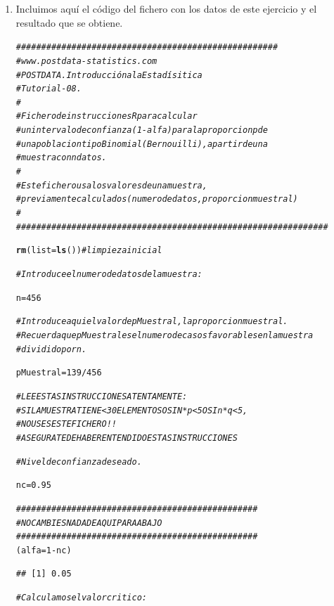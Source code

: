 \documentclass[10pt,a4paper]{article}\usepackage[]{graphicx}\usepackage[]{color}
\makeatletter
\newcommand{\hlnum}[1]{\textcolor[rgb]{0.686,0.059,0.569}{#1}}%
\newcommand{\hlcom}[1]{\textcolor[rgb]{0.678,0.584,0.686}{\textit{#1}}}%
\newcommand{\hlopt}[1]{\textcolor[rgb]{0,0,0}{#1}}%
\newcommand{\hlstd}[1]{\textcolor[rgb]{0.345,0.345,0.345}{#1}}%
\newcommand{\hlkwb}[1]{\textcolor[rgb]{0.69,0.353,0.396}{#1}}%
\newcommand{\hlkwc}[1]{\textcolor[rgb]{0.333,0.667,0.333}{#1}}%
\newcommand{\hlkwd}[1]{\textcolor[rgb]{0.737,0.353,0.396}{\textbf{#1}}}%
\newenvironment{kframe}{%
 \def\at@end@of@kframe{}%
 \ifinner\ifhmode%
  \def\at@end@of@kframe{\end{minipage}}%
  \begin{minipage}{\columnwidth}%
 \fi\fi%
 \def\FrameCommand##1{\hskip\@totalleftmargin \hskip-\fboxsep
 \colorbox{shadecolor}{##1}\hskip-\fboxsep
     \hskip-\linewidth \hskip-\@totalleftmargin \hskip\columnwidth}%
 \MakeFramed {\advance\hsize-\width
   \@totalleftmargin\z@ \linewidth\hsize
   \@setminipage}}%
 {\par\unskip\endMakeFramed%
 \at@end@of@kframe}
\newenvironment{knitrout}{}{} %
\makeatother
\begin{document}
\begin{enumerate}
  \item Incluimos aquí el código del fichero con los datos de este ejercicio y el resultado que se obtiene.

\begin{knitrout}
\color{fgcolor}\begin{kframe}
\begin{alltt}
\hlcom{####################################################}
\hlcom{# www.postdata-statistics.com}
\hlcom{# POSTDATA. Introducción a la Estadísitica}
\hlcom{# Tutorial-08.}
\hlcom{#}
\hlcom{# Fichero de instrucciones R para calcular}
\hlcom{# un intervalo de confianza (1-alfa) para la proporcion p de}
\hlcom{# una poblacion tipo Binomial (Bernouilli), a partir de una}
\hlcom{# muestra con n datos.}
\hlcom{#}
\hlcom{# Este fichero usa los valores de una muestra,}
\hlcom{# previamente calculados (numero de datos, proporcion muestral)}
\hlcom{#}
\hlcom{##############################################################}

\hlkwd{rm}\hlstd{(}\hlkwc{list}\hlstd{=}\hlkwd{ls}\hlstd{())} \hlcom{#limpieza inicial}

\hlcom{# Introduce el numero de datos de la muestra:}

\hlstd{n} \hlkwb{=} \hlnum{456}

\hlcom{# Introduce aqui el valor de pMuestral, la proporcion muestral .}
\hlcom{# Recuerda que pMuestral es el numero de casos favorables en la muestra}
\hlcom{# dividido por n.}

\hlstd{pMuestral} \hlkwb{=} \hlnum{139} \hlopt{/} \hlnum{456}

\hlcom{# LEE ESTAS INSTRUCCIONES ATENTAMENTE:}
\hlcom{# SI LA MUESTRA TIENE < 30 ELEMENTOS O SI N*p<5 O SI n*q<5,}
\hlcom{# NO USES ESTE FICHERO!!}
\hlcom{# ASEGURATE DE HABER ENTENDIDO ESTAS INSTRUCCIONES}

\hlcom{# Nivel de confianza deseado.}

\hlstd{nc} \hlkwb{=} \hlnum{0.95}

\hlcom{################################################}
\hlcom{#NO CAMBIES NADA DE AQUI PARA ABAJO}
\hlcom{################################################}
\hlstd{(alfa} \hlkwb{=} \hlnum{1} \hlopt{-} \hlstd{nc )}
\end{alltt}
\begin{verbatim}
## [1] 0.05
\end{verbatim}
\begin{alltt}
\hlcom{# Calculamos el valor critico:}


\end{alltt}
\end{kframe}
\end{knitrout}
\end{enumerate}
\end{document}
